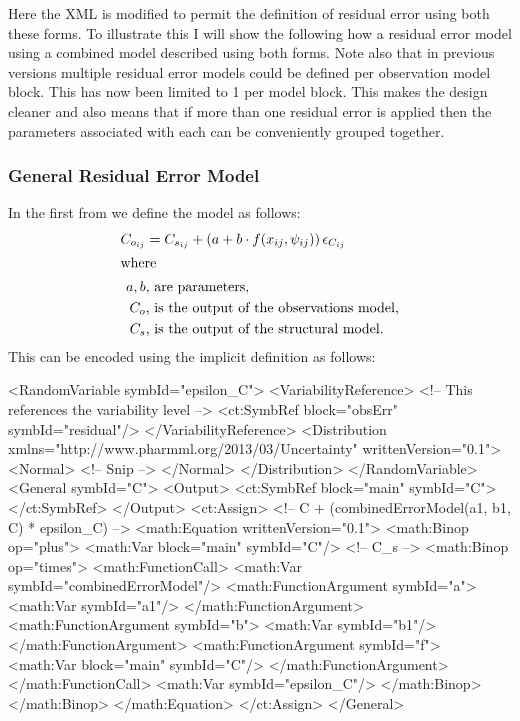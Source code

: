 \documentclass[a4paper,10pt]{article}
\newcommand{\watchout}{\marginpar{\hspace*{34pt}\raisebox{-0.5ex}{\Large\ding{43}}}}
\begin{document}
Here the XML is modified to permit the definition of residual error
using both these forms. To illustrate this I will show the following
how a residual error model using a combined model described using both
forms. \watchout Note also that in previous versions multiple residual error
models could be defined per observation model block. This has now been
limited to 1 per model block. This makes the design cleaner and also
means that if more than one residual error is applied then the
parameters associated with each can be conveniently grouped together.

\subsubsection{General Residual Error Model}

In the first from we define the model as follows:
%
\begin{align*}
C_{o_{ij}} &= C_{s_{ij}} + \left(a + b \cdot f(x_{ij}, \psi_{ij}) \right) \epsilon_{C_{ij}}\\
\intertext{where}
a, b & \text{, are parameters,}\\
C_{o} & \text{, is the output of the observations model,}\\
C_{s} & \text{, is the output of the structural model.}
\end{align*}
%
This can be encoded using the implicit definition as follows:
%
\begin{xmlcode}
    <RandomVariable symbId="epsilon_C">
        <VariabilityReference> <!-- This references the variability level -->
            <ct:SymbRef block="obsErr" symbId="residual"/>
        </VariabilityReference>
        <Distribution xmlns="http://www.pharmml.org/2013/03/Uncertainty"
            writtenVersion="0.1">
            <Normal>
              <!-- Snip -->
            </Normal>
        </Distribution>
    </RandomVariable>
    <General  symbId="C">
        <Output>
            <ct:SymbRef block="main" symbId="C"></ct:SymbRef>
        </Output>
        <ct:Assign>
            <!-- C + (combinedErrorModel(a1, b1, C) * epsilon_C) -->
            <math:Equation writtenVersion="0.1">
                <math:Binop op="plus">
                    <math:Var block="main" symbId="C"/> <!-- C_{s} -->
                    <math:Binop op="times">
                        <math:FunctionCall>
                            <math:Var symbId="combinedErrorModel"/>
                            <math:FunctionArgument symbId="a">
                                <math:Var symbId="a1"/>
                            </math:FunctionArgument>
                            <math:FunctionArgument symbId="b">
                                <math:Var symbId="b1"/>
                            </math:FunctionArgument>
                            <math:FunctionArgument symbId="f">
                                <math:Var block="main" symbId="C"/>
                            </math:FunctionArgument>
                        </math:FunctionCall>
                        <math:Var symbId="epsilon_C"/>
                    </math:Binop>
                </math:Binop>
            </math:Equation>
        </ct:Assign>
    </General>
\end{xmlcode}
\end{document}
